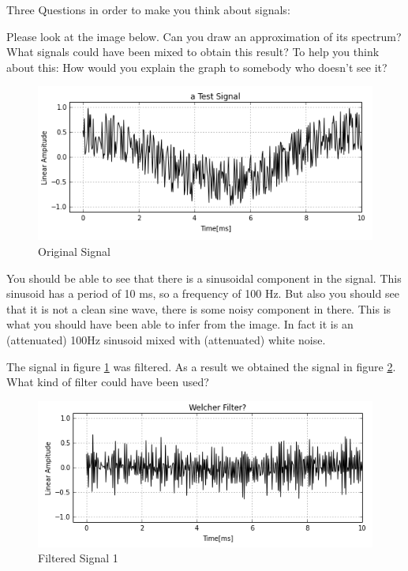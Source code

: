 Three Questions in order to make you think about signals:


\begin{question}
	Please look at the image below. Can you draw an approximation of its spectrum? What signals could have been mixed to obtain this result? To help you think about this: How would you explain the graph to somebody who doesn't see it?
\begin{figure}[H]
	\begin{center}
		\includegraphics[width = 14cm]{raetsel_original.png}
		\caption{Original Signal}
		\label{fig:originalSignal}
	\end{center}
\end{figure}
\end{question}


\begin{Answer}
You should be able to see that there is a sinusoidal component in the signal. This sinusoid has a period of 10 ms, so a frequency of 100 Hz. But also you should see that it is not a clean sine wave, there is some noisy component in there. This is what you should have been able to infer from the image. In fact it is an (attenuated) 100Hz sinusoid mixed with (attenuated) white noise.
\end{Answer}


\begin{question}
	The signal in figure \ref{fig:originalSignal} was filtered. As a result we obtained the signal in figure \ref{fig:filtered1}. What kind of filter could have been used?
	\begin{figure}[H]
	\begin{center}
		\includegraphics[width = 14cm]{raetsel_highpass.png}
		\caption{Filtered Signal 1}
		\label{fig:filtered1}
	\end{center}
	\end{figure}
\end{question}

